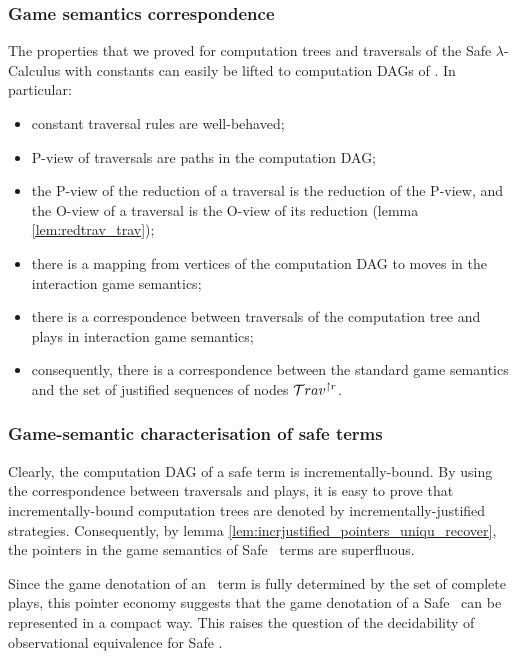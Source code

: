 \subsubsection{Game semantics correspondence}
The properties that we proved for computation trees and traversals
of the Safe $\lambda$-Calculus with constants can easily be lifted
to computation DAGs of \ialgol. In particular:
\begin{itemize}
\item constant traversal rules are well-behaved;
\item P-view of traversals are paths in the computation DAG;
\item the P-view of the reduction of a traversal is the reduction of the P-view,
and the O-view of a traversal is the O-view of its reduction (lemma
\ref{lem:redtrav_trav});
\item there is a mapping from vertices of the computation DAG to moves in the interaction game semantics;
\item there is a correspondence between traversals of the computation tree and plays in interaction game semantics;
\item consequently, there is a correspondence between the standard game semantics and
the set of justified sequences of nodes $\mathcal{T}rav^{\upharpoonright
r}$.
\end{itemize}

\subsubsection{Game-semantic characterisation of safe terms}
Clearly, the computation DAG of a safe term is incrementally-bound.
By using the correspondence between traversals and plays, it is easy
to prove that incrementally-bound computation trees are denoted by
incrementally-justified strategies. Consequently, by lemma
\ref{lem:incrjustified_pointers_uniqu_recover}, the pointers in the
game semantics of Safe \ialgol\ terms are superfluous.

Since the game denotation of an \ialgol\ term is fully determined by
the set of complete plays, this pointer economy suggests that the
game denotation of a Safe \ialgol\ can be represented in a compact
way. This raises the question of the decidability of observational
equivalence for Safe \ialgol.
